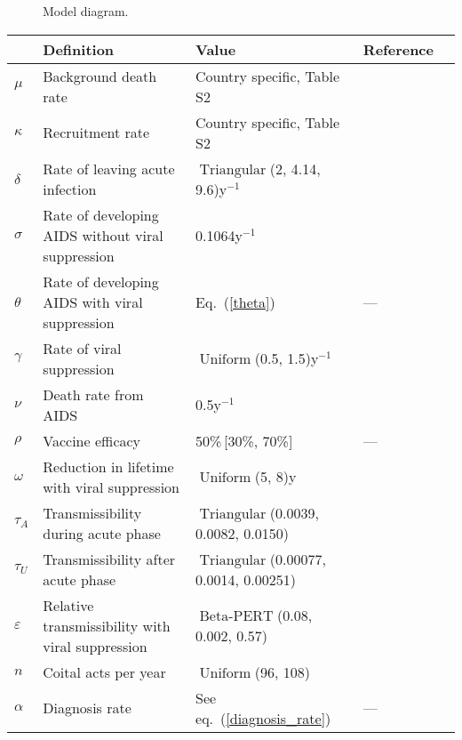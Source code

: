\documentclass{article}
\DeclareMathOperator{\Uniform}{Uniform}
\DeclareMathOperator{\Triangular}{Triangular}
\DeclareMathOperator{\BetaPERT}{Beta-PERT}
\begin{document}
\begin{figure}
  \centering
  
  \caption{Model diagram.}
  \label{model_diag}
\end{figure}

\begin{table}
  \begin{center}
    \begin{tabularx}{\textwidth}{lXlll}
      \hline
      & Definition & Value & Reference \\
      \hline
      $\mu$ & Background death rate & Country specific, Table S2
      & \cite{World_Development_Indicators2013-ee} \\
      $\kappa$ & Recruitment rate & Country specific, Table S2
      & \cite{World_Development_Indicators2013-ee, WorldBankpg} \\
      $\delta$	& Rate of leaving acute infection
      & $\Triangular$(2, 4.14, 9.6)\;y$^{-1}$
      & \cite{Hollingsworth2008-iy} \\
      $\sigma$	& Rate of developing AIDS without viral suppression
      & 0.1064\;y$^{-1}$ & \cite{Morgan2002-cq} \\
      $\theta$ & Rate of developing AIDS with viral suppression
      & Eq.~(\ref{theta}) & --- \\
      $\gamma$ & Rate of viral suppression
      & $\Uniform$(0.5, 1.5)\;y$^{-1}$
      & \cite{Currie2009-yz} \\
      $\nu$ & Death rate from AIDS & 0.5\;y$^{-1}$
      & \cite{Morgan2002-cq} \\
      $\rho$ & Vaccine efficacy & 50\%\,[30\%, 70\%] & --- \\
      $\omega$	& Reduction in lifetime with viral suppression
      & $\Uniform$(5, 8)\;y
      & \cite{Samji2013-kf, Unaids2014-ue} \\
      $\tau_{A}$ & Transmissibility during acute phase
      & $\Triangular$(0.0039, 0.0082, 0.0150)
      & \cite{Wawer2005-us, Skarbinski2015-ni}\\
      $\tau_{U}$ & Transmissibility after acute phase
      & $\Triangular$(0.00077, 0.0014, 0.00251)
      & \cite{Hughes2012-so} \\
      $\varepsilon$ & Relative transmissibility with
      viral suppression & $\BetaPERT$(0.08, 0.002, 0.57)
      & \cite{Donnell2010-xo} \\
      $n$ & Coital acts per year & $\Uniform$(96, 108)
      & \cite{Wawer2005-us, Abdool_Karim2010-cm}\\
      $\alpha$ & Diagnosis rate & See eq.~(\ref{diagnosis_rate}) & --- \\

\end{tabularx}
\end{center}
\end{table}
\end{document}
